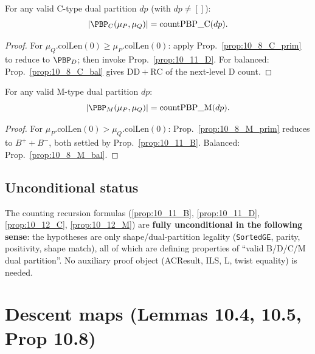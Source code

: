 \begin{proposition}
  \label{prop:10_12_C}
  \leanok
  For any valid C-type dual partition $dp$ (with $dp \neq []$):
  \[ |\PBP_C(\mu_P, \mu_Q)| = \mathrm{countPBP\_C}(dp). \]
\end{proposition}
\begin{proof}
  \leanok
  For $\mu_Q.\mathrm{colLen}(0) \geq \mu_P.\mathrm{colLen}(0)$: apply Prop.~\ref{prop:10_8_C_prim} to reduce to $\PBP_D$; then invoke Prop.~\ref{prop:10_11_D}. For balanced: Prop.~\ref{prop:10_8_C_bal} gives $\mathrm{DD} + \mathrm{RC}$ of the next-level D count.
\end{proof}


\begin{proposition}
  \label{prop:10_12_M}
  \leanok
  For any valid M-type dual partition $dp$:
  \[ |\PBP_M(\mu_P, \mu_Q)| = \mathrm{countPBP\_M}(dp). \]
\end{proposition}
\begin{proof}
  \leanok
  For $\mu_P.\mathrm{colLen}(0) > \mu_Q.\mathrm{colLen}(0)$: Prop.~\ref{prop:10_8_M_prim} reduces to $B^+ + B^-$, both settled by Prop.~\ref{prop:10_11_B}. Balanced: Prop.~\ref{prop:10_8_M_bal}.
\end{proof}


\section{Unconditional status}

The counting recursion formulas (\ref{prop:10_11_B}, \ref{prop:10_11_D},
\ref{prop:10_12_C}, \ref{prop:10_12_M}) are \textbf{fully unconditional in the
following sense}: the hypotheses are only shape/dual-partition legality
(\texttt{SortedGE}, parity, positivity, shape match), all of which are
defining properties of ``valid B/D/C/M dual partition''. No auxiliary proof
object (ACResult, ILS, L, twist equality) is needed.


\chapter{Descent maps (Lemmas 10.4, 10.5, Prop 10.8)}
\label{chap:descent}

